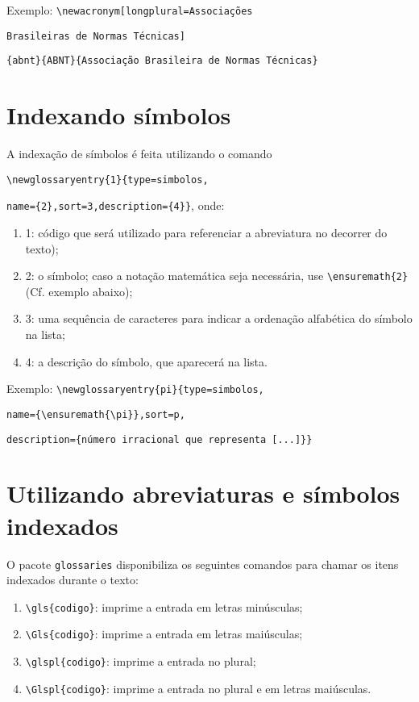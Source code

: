 \documentclass{fei}
\begin{document}
	Exemplo: \verb+\newacronym[longplural=Associações+
	
			 \verb+Brasileiras de Normas Técnicas]+
			 
			 \verb+{abnt}{ABNT}{Associação Brasileira de Normas Técnicas}+
			 
	\section{Indexando símbolos}
	
	A indexação de símbolos é feita utilizando o comando
	
	\verb+\newglossaryentry{1}{type=simbolos,+
	
	\verb+name={2},sort=3,description={4}}+, onde:
	
	\begin{enumerate}
	\item 1: código que será utilizado para referenciar a abreviatura no decorrer do texto);
	\item 2: o símbolo; caso a notação matemática seja necessária, use \verb+\ensuremath{2}+ (Cf. exemplo abaixo);
	\item 3: uma sequência de caracteres para indicar a ordenação alfabética do símbolo na lista;
	\item 4: a descrição do símbolo, que aparecerá na lista.
	\end{enumerate}
	
	Exemplo: \verb+\newglossaryentry{pi}{type=simbolos,+
	
			 \verb+name={\ensuremath{\pi}},sort=p,+
			 
			 \verb+description={número irracional que representa [...]}}+

	\section{Utilizando abreviaturas e símbolos indexados}
	
	O pacote \verb+glossaries+ disponibiliza os seguintes comandos para chamar os itens indexados durante o texto:
	
	\begin{enumerate}
	\item \verb+\gls{codigo}+: imprime a entrada em letras minúsculas;
	\item \verb+\Gls{codigo}+: imprime a entrada em letras maiúsculas;
	\item \verb+\glspl{codigo}+: imprime a entrada no plural;
	\item \verb+\Glspl{codigo}+: imprime a entrada no plural e em letras maiúsculas.
	\end{enumerate}
	
\end{document}
